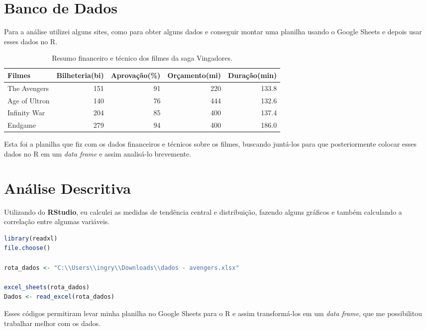 \documentclass[
    12pt,                  %
    openright,             %
    oneside,               %
    a4paper,               %
    chapter=TITLE,         %
    section=TITLE,         %
    brazil                 %
]{abntex2}                 %
\begin{document}
\section{Banco de Dados}
Para a análise utilizei alguns sites, como \cite{dados2025} para obter alguns dados e conseguir montar uma planilha usando o Google Sheets e depois usar esses dados no R.

\begin{table}[h]
\centering
\begin{tabular}{|l|r|r|r|r|}
\hline
\textbf{Filmes} & \textbf{Bilheteria(bi)} & \textbf{Aprovação(\%) } & \textbf{Orçamento(mi)} & \textbf{Duração(min)} \\
\hline \hline
The Avengers    & 151 & 91 & 220 & 133.8 \\
Age of Ultron   & 140 & 76 & 444 & 132.6 \\
Infinity War    & 204 & 85 & 400 & 137.4 \\
Endgame         & 279 & 94 & 400 & 186.0 \\
\hline
\end{tabular}
\caption{Resumo financeiro e técnico dos filmes da saga Vingadores.}
\label{tab:vng}
\end{table}
\vspace{0.2cm}
\noindent Esta foi a planilha que fiz com os dados financeiros e técnicos sobre os filmes, buscando juntá-los para que posteriormente colocar esses dados no R em um \textit{data frame} e assim analisá-lo brevemente.

\section{Análise Descritiva}
Utilizando do \textbf{RStudio}, eu calculei as medidas de tendência central e distribuição, fazendo alguns gráficos e também calculando a correlação entre algumas variáveis.

\begin{lstlisting}[language=R]
library(readxl)
file.choose()

rota_dados <- "C:\\Users\\ingry\\Downloads\\dados - avengers.xlsx"

excel_sheets(rota_dados)
Dados <- read_excel(rota_dados)
\end{lstlisting}
\vspace{0.1cm}
Esses códigos permitiram levar minha planilha no Google Sheets para o R e assim transformá-los em um \textit{data frame}, que me possibilitou trabalhar melhor com os dados.
\end{document}
